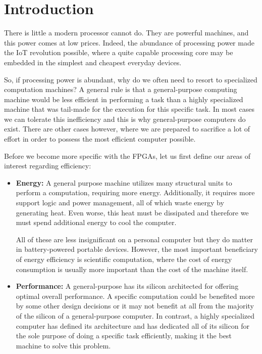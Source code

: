 \chapter{Introduction}

There is little a modern processor cannot do. They are powerful machines, and this power comes at low prices.
Indeed, the abundance of processing power made the IoT revolution possible, where a quite capable processing core
may be embedded in the simplest and cheapest everyday devices.

So, if processing power is abundant, why do we often need to resort to specialized computation machines?
A general rule is that a general-purpose computing machine would be less efficient in performing a task
than a highly specialized machine that was tail-made for the execution for this specific task.
In most cases we can tolerate this inefficiency and this is why general-purpose computers do exist.
There are other cases however, where we are prepared to sacrifice a lot of effort in order to
possess the most efficient computer possible.

Before we become more specific with the FPGAs, let us first define our areas
of interest regarding efficiency:

\begin{itemize}
\item	\textbf{Energy:} 
	A general purpose machine utilizes many structural units to perform a computation,
	requiring more energy. Additionally, it requires more support logic and power management, all of which
	waste energy by generating heat. Even worse, this heat must be dissipated and therefore we must spend
	additional energy to cool the computer.

	All of these are less insignificant on a personal computer but they do matter in battery-powered portable devices.
	However, the most important beneficiary of energy efficiency is scientific computation, where the cost of
	energy consumption is usually more important than the cost of the machine itself.

\item	\textbf{Performance:}
	A general-purpose has its silicon architected for offering optimal overall performance. 
	A specific computation could be benefited more by some other design decisions or
	it may not benefit at all from the majority of the silicon of a general-purpose computer.
	In contrast, a highly specialized computer has defined its architecture and has dedicated all of its silicon
	for the sole purpose of doing a specific task efficiently, making it the best machine to solve this problem.
\end{itemize}

